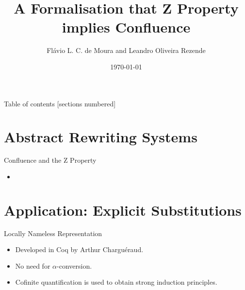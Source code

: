 \documentclass[10pt]{beamer}
\title{A Formalisation that Z Property implies Confluence}
\date{\today}
\author{Flávio L. C. de Moura and Leandro Oliveira Rezende}
\institute{Universidade de Brasília}
\begin{document}
\maketitle
\begin{frame}{Table of contents}
  [sections numbered]
  \tableofcontents[hideallsubsections]
\end{frame}

\section{Abstract Rewriting Systems}

\begin{frame}[fragile]{Confluence and the Z Property}
\begin{itemize}
  \item 
  \end{itemize} 
\end{frame}

\section{Application: Explicit Substitutions}

\begin{frame}[fragile]{Locally Nameless Representation}
\begin{itemize}
\item Developed in Coq by Arthur Charguéraud.
\item No need for $\alpha$-conversion.
\item Cofinite quantification is used to obtain strong induction principles.
\end{itemize}
\end{frame}


\end{document}
